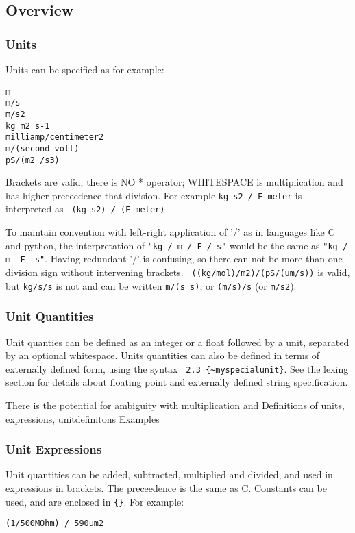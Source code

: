 \documentclass{article}
\begin{document}
\subsection{Overview}
\subsubsection*{Units}
Units can be specified as for example:
\begin{verbatim}
m
m/s 
m/s2 
kg m2 s-1
milliamp/centimeter2
m/(second volt) 
pS/(m2 /s3)
\end{verbatim}

Brackets are valid, there is NO * operator; WHITESPACE is multiplication and has higher preceedence that division. For example
\verb|kg s2 / F meter| is interpreted as \verb| (kg s2) / (F meter)|

To maintain convention with left-right  application of '/' as in languages like C and python, the interpretation of  \verb|"kg / m / F / s"| would be the same as \verb|"kg / m  F  s"|. Having redundant '/' is confusing, so there can not be more than one division sign without intervening brackets.
\verb| ((kg/mol)/m2)/(pS/(um/s))| is valid, but \verb|kg/s/s| is not and can be written \verb|m/(s s)|, or \verb|(m/s)/s| (or \verb|m/s2|).


\subsubsection*{Unit Quantities}

Unit quanties can be defined as an integer or a float followed by a unit, separated by an optional whitespace. 
Units quantities can also be defined in terms of externally defined form, using the syntax
\verb| 2.3 {~myspecialunit}|.  See the lexing section for details about floating point and externally defined string specification.



There is the potential for ambiguity with multiplication and 
Definitions of units, expressions, unitdefinitons
Examples

\subsubsection*{Unit Expressions}
Unit quantities can be added, subtracted, multiplied and divided, and used in expressions in brackets. The preceedence is the same as C.
Constants can be used, and are enclosed in \verb|{}|.
For example:
\begin{verbatim}
(1/500MOhm) / 590um2

\end{verbatim}
\end{document}
